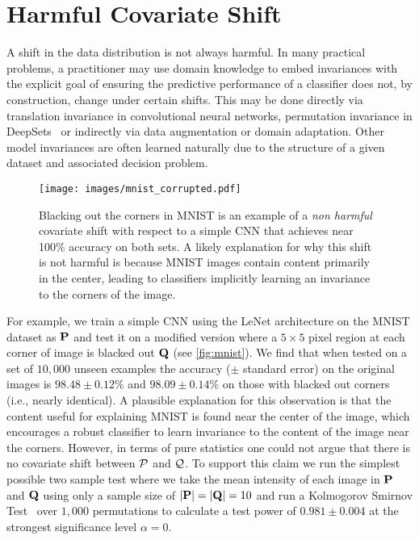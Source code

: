 \section{Harmful Covariate Shift}\label{sec:harmful-covariate-shift} A shift in the data distribution is not always harmful.
In many practical problems, a practitioner may use domain knowledge to embed invariances with the explicit goal of ensuring the predictive performance of a classifier does not, by construction, change under certain shifts.
This may be done directly via translation invariance in convolutional neural networks, permutation invariance in DeepSets~\citep{deepsets} or indirectly via data augmentation or domain adaptation.
Other model invariances are often learned naturally due to the structure of a given dataset and associated decision problem.

\begin{wrapfigure}{r}{0.5\textwidth}
    \vspace{-8mm}
    \begin{center}
        \texttt{[image: images/mnist\_corrupted.pdf]}
    \end{center}
    \vspace{4mm}
    \caption{\small Blacking out the corners in MNIST is an example of a \textit{non harmful} covariate shift with respect to a simple CNN that achieves near 100\% accuracy on both sets.
    A likely explanation for why this shift is not harmful is because MNIST images contain content primarily in the center, leading to classifiers implicitly learning an invariance to the corners
    of the image.}
    \label{fig:mnist}
    \vspace{-8mm}
\end{wrapfigure}
For example, we train a simple CNN using the LeNet architecture on the MNIST dataset as $\mathbf{P}$ and test it on a modified version where a $5\times 5$ pixel region at each corner of image is blacked out $\mathbf{Q}$ (see \autoref{fig:mnist}).
We find that when tested on a set of $10,000$ unseen examples the accuracy ($\pm$ standard error) on the original images is $98.48\pm 0.12 \%$ and $98.09\pm 0.14 \%$ on those with blacked out corners (i.e., nearly identical).
A plausible explanation for this observation is that the content useful for explaining MNIST is found near the center of the image,
which encourages a robust classifier to learn invariance to the content of the image near the corners.
However, in terms of pure statistics one could not argue that there is no covariate shift between $\mathcal{P}$ and $\mathcal{Q}$.
To support this claim we run the simplest possible two sample test where we take the mean intensity of each image in $\mathbf{P}$ and $\mathbf{Q}$ using only a sample size of $|\mathbf{P}|=|\mathbf{Q}|=10$ and
run a Kolmogorov Smirnov Test~\citep{kstest} over $1,000$ permutations to calculate a test power of $0.981\pm 0.004$ at the strongest significance level $\alpha=0$.

